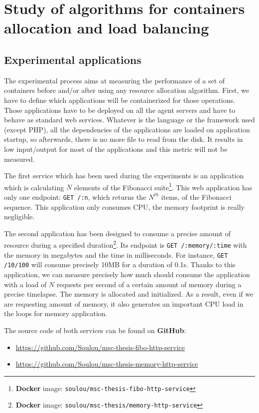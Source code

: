 \chapter{Study of algorithms for containers allocation and load balancing}
\label{chapt:containerloadbalance}

\section{Experimental applications}

The experimental process aims at measuring the performance of a set of
containers before and/or after using any resource allocation algorithm. First,
we have to define which applications will be containerized for those
operations. Those applications have to be deployed on all the agent servers and
have to behave as standard web services. Whatever is the language or the
framework used (except PHP), all the dependencies of the applications are
loaded on application startup, so afterwards, there is no more file to read
from the disk. It results in low input/output for most of the applications and
this metric will not be measured.

The first service which has been used during the experiments is an application which
is calculating $N$ elements of the Fibonacci suite\footnote{\textbf{Docker}
image: \texttt{soulou/msc-thesis-fibo-http-service}}. This web application has
only one endpoint: \texttt{GET /:n}, which returns the $N^{th}$ items, of the
Fibonacci sequence. This application only consumes CPU, the memory footprint is
really negligible.

The second application has been designed to consume a precise amount of
resource during a specified duration\footnote{\textbf{Docker} image:
\texttt{soulou/msc-thesis/memory-http-service}}. Its endpoint is \texttt{GET
/:memory/:time} with the memory in megabytes and the time in milliseconds. For
instance, \texttt{GET /10/100} will consume precisely 10MB for a duration of
0.1s. Thanks to this application, we can measure precisely how much should
consume the application with a load of $N$ requests per second of a certain
amount of memory during a precise timelapse.  The memory is allocated and
initialized. As a result, even if we are requesting amount of memory, it also
generates an important CPU load in the loops for memory application.

The source code of both services can be found on \textbf{GitHub}:
\begin{itemize}
\item{\url{https://github.com/Soulou/msc-thesis-fibo-http-service}}
\item{\url{https://github.com/Soulou/msc-thesis-memory-http-service}}
\end{itemize}

